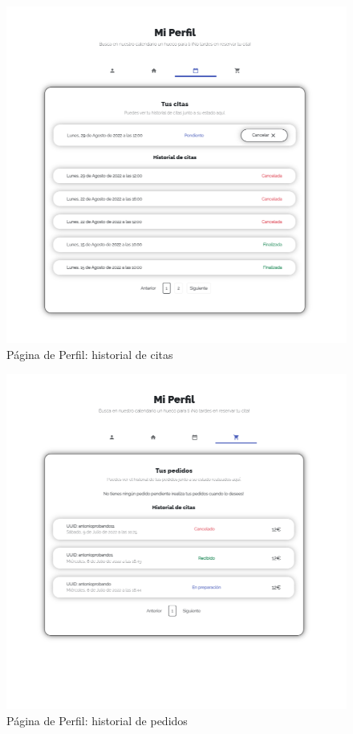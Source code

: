 \begin{figure}[H]
  \centering
  \includegraphics[scale=0.4]{images/front-end-profile-3.png}
  \caption{Página de Perfil: historial de citas}
  \label{}
\end{figure}

\begin{figure}[H]
  \centering
  \includegraphics[scale=0.4]{images/front-end-profile-4.png}
  \caption{Página de Perfil: historial de pedidos}
  \label{}
\end{figure}